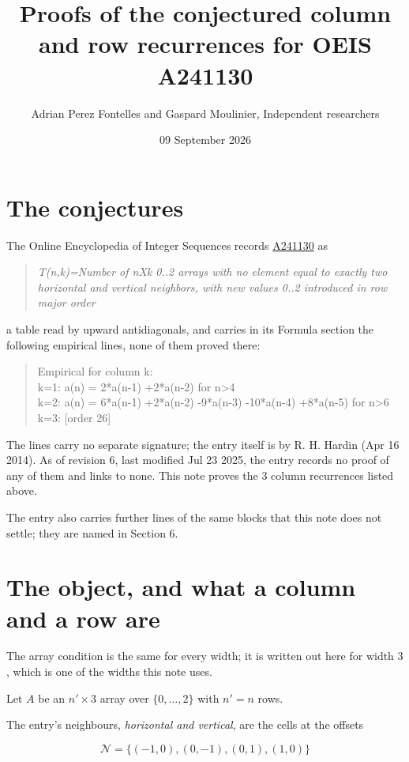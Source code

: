 \documentclass[11pt]{article}
\title{Proofs of the conjectured column and row recurrences for OEIS A241130}
\author{Adrian Perez Fontelles and Gaspard Moulinier, Independent researchers}
\date{09 September 2026}
\theoremstyle{definition}
\begin{document}
\maketitle
\section{The conjectures}

The Online Encyclopedia of Integer Sequences records \href{https://oeis.org/A241130}{A241130} as

\begin{quote}\itshape T(n,k)=Number of nXk 0..2 arrays with no element equal to exactly two horizontal and vertical neighbors, with new values 0..2 introduced in row major order\end{quote}

a table read by upward antidiagonals, and carries in its Formula section the following empirical lines, none of them proved there:

\begin{quote}\ttfamily Empirical for column k:\\
k=1: a(n) = 2*a(n-1) +2*a(n-2) for n>4\\k=2: a(n) = 6*a(n-1) +2*a(n-2) -9*a(n-3) -10*a(n-4) +8*a(n-5) for n>6\\k=3: [order 26]\end{quote}

The lines carry no separate signature; the entry itself is by R. H. Hardin (Apr 16 2014). As of revision 6, last modified Jul 23 2025, the entry records no proof of any of them and links to none. This note proves the 3 column recurrences listed above.

The entry also carries further lines of the same blocks that this note does not settle; they are named in Section 6.

\section{The object, and what a column and a row are}

The array condition is the same for every width; it is written out here for width $3$, which is one of the widths this note uses.

Let $A$ be an $n' \times 3$ array over $\{0,\dots,2\}$ with $n' = n$ rows.

The entry's neighbours, {\itshape horizontal and vertical}, are the cells at the offsets

\[\mathcal{N} = \{(-1,0), (0,-1), (0,1), (1,0)\}\]
\end{document}
